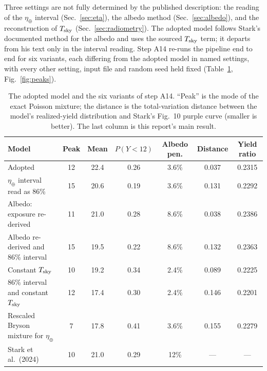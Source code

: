 \documentclass[11pt,a4paper]{article}
\begin{document}
Three settings are not fully determined by the published description: the reading of the
$\eta_\oplus$ interval (Sec.~\ref{sec:eta}), the albedo method (Sec.~\ref{sec:albedo}), and the
reconstruction of $T_{\rm sky}$ (Sec.~\ref{sec:radiometry}). The adopted model follows Stark's
documented method for the albedo and uses the sourced $T_{\rm sky}$ term; it departs from his text
only in the interval reading. Step A14 re-runs the pipeline end to end for six variants, each
differing from the adopted model in named settings, with every other setting, input file and
random seed held fixed (Table~\ref{tab:variants}, Fig.~\ref{fig:peaks}).

\begin{table}[htbp]
\centering
\footnotesize
\setlength{\tabcolsep}{4pt}
\begin{tabular}{lcccccc}
\toprule
\textbf{Model} & \textbf{Peak} & \textbf{Mean} & \textbf{$P(Y<12)$} & \textbf{Albedo pen.} &
\textbf{Distance} & \textbf{Yield ratio} \\
\midrule
Adopted                                      & 12  & 22.4  & 0.26  & 3.6\%  & 0.037  & 0.2315 \\
$\eta_\oplus$ interval read as 86\%          & 15 & 20.6 & 0.19 & 3.6\% & 0.131 & 0.2292 \\
Albedo: exposure re-derived                  & 11   & 21.0   & 0.28   & 8.6\%   & 0.038   & 0.2386 \\
Albedo re-derived and 86\% interval          & 15  & 19.5  & 0.22  & 8.6\%  & 0.132  & 0.2363 \\
Constant $T_{\rm sky}$                       & 10   & 19.2   & 0.34   & 2.4\%   & 0.089   & 0.2225 \\
86\% interval and constant $T_{\rm sky}$     & 12  & 17.4  & 0.30  & 2.4\%  & 0.146  & 0.2201 \\
Rescaled Bryson mixture for $\eta_\oplus$    & 7   & 17.8   & 0.41   & 3.6\%   & 0.155   & 0.2279 \\
\midrule
Stark et al.\ (2024)                         & 10   & 21.0             & 0.29              & 12\%                 & ---            & --- \\
\bottomrule
\end{tabular}
\caption{The adopted model and the six variants of step A14. ``Peak'' is the mode of the exact
Poisson mixture; the distance is the total-variation distance between the model's realized-yield
distribution and Stark's Fig.~10 purple curve (smaller is better). The last column is this
report's main result.}
\label{tab:variants}
\end{table}
\end{document}
